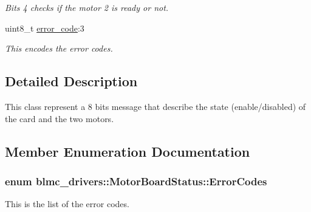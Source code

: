 \begin{DoxyCompactItemize}
\begin{DoxyCompactList}\small\item\em Bits 4 checks if the motor 2 is ready or not. \end{DoxyCompactList}\item 
uint8\+\_\+t \hyperlink{classblmc__drivers_1_1MotorBoardStatus_ad1a5cb78d86e76a60750c0e3e6b34b7e}{error\+\_\+code}\+:3
\begin{DoxyCompactList}\small\item\em This encodes the error codes. \end{DoxyCompactList}\end{DoxyCompactItemize}


\subsection{Detailed Description}
This class represent a 8 bits message that describe the state (enable/disabled) of the card and the two motors. 

\subsection{Member Enumeration Documentation}
\subsubsection[{\texorpdfstring{Error\+Codes}{ErrorCodes}}]{\setlength{\rightskip}{0pt plus 5cm}enum {\bf blmc\+\_\+drivers\+::\+Motor\+Board\+Status\+::\+Error\+Codes}}\hypertarget{classblmc__drivers_1_1MotorBoardStatus_a9fd931e24550f5e5877d7a6cf499f6cf}{}\label{classblmc__drivers_1_1MotorBoardStatus_a9fd931e24550f5e5877d7a6cf499f6cf}


This is the list of the error codes. 

